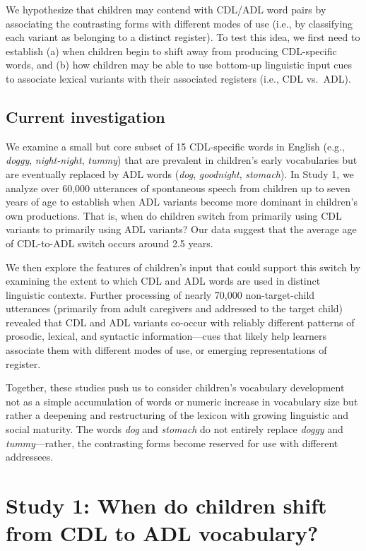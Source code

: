 \documentclass[10pt, letterpaper]{article}
\begin{document}
We hypothesize that children may contend with CDL/ADL word pairs by
associating the contrasting forms with different modes of use (i.e., by
classifying each variant as belonging to a distinct register). To test
this idea, we first need to establish (a) when children begin to shift
away from producing CDL-specific words, and (b) how children may be able
to use bottom-up linguistic input cues to associate lexical variants
with their associated registers (i.e., CDL vs.~ADL).

\hypertarget{current-investigation}{%
\subsection{Current investigation}\label{current-investigation}}

We examine a small but core subset of 15 CDL-specific words in English
(e.g., \emph{doggy}, \emph{night-night}, \emph{tummy}) that are
prevalent in children's early vocabularies but are eventually replaced
by ADL words (\emph{dog}, \emph{goodnight}, \emph{stomach}). In Study 1,
we analyze over 60,000 utterances of spontaneous speech from children up
to seven years of age to establish when ADL variants become more
dominant in children's own productions. That is, when do children switch
from primarily using CDL variants to primarily using ADL variants? Our
data suggest that the average age of CDL-to-ADL switch occurs around 2.5
years.

We then explore the features of children's input that could support this
switch by examining the extent to which CDL and ADL words are used in
distinct linguistic contexts. Further processing of nearly 70,000
non-target-child utterances (primarily from adult caregivers and
addressed to the target child) revealed that CDL and ADL variants
co-occur with reliably different patterns of prosodic, lexical, and
syntactic information---cues that likely help learners associate them
with different modes of use, or emerging representations of register.

Together, these studies push us to consider children's vocabulary
development not as a simple accumulation of words or numeric increase in
vocabulary size but rather a deepening and restructuring of the lexicon
with growing linguistic and social maturity. The words \emph{dog} and
\emph{stomach} do not entirely replace \emph{doggy} and
\emph{tummy}---rather, the contrasting forms become reserved for use
with different addressees.

\hypertarget{study-1-when-do-children-shift-from-cdl-to-adl-vocabulary}{%
\section{Study 1: When do children shift from CDL to ADL
vocabulary?}\label{study-1-when-do-children-shift-from-cdl-to-adl-vocabulary}}
\end{document}
